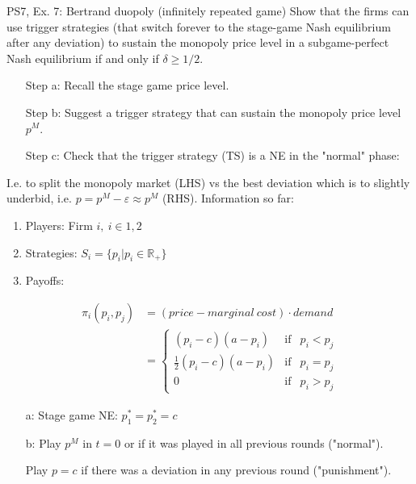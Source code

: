 \begin{frame}{PS7, Ex. 7: Bertrand duopoly (infinitely repeated game)}
    Show that the firms can use trigger strategies (that switch forever to the stage-game Nash equilibrium after any deviation) to sustain the monopoly price level in a subgame-perfect Nash equilibrium if and only if $\delta\geq1/2$.
    \vspace{-6pt}
    \begin{multicols}{2}
      \begin{itemize}
        \item[Step a:] Recall the stage game price level.
        \item[Step b:] Suggest a trigger strategy that can sustain the monopoly price level $p^M$.
        \item[Step c:] Check that the trigger strategy (TS) is a NE in the "normal" phase:
      \end{itemize}
      \vspace{-4pt}
      I.e. to split the monopoly market (LHS) vs the best deviation which is to slightly underbid, i.e. $p=p^M-\varepsilon\approx p^M$ (RHS).
      \vfill\null\columnbreak
      Information so far:
      \vspace{-4pt}
      \begin{enumerate}
        \item Players: Firm $i,\ i\in1,2$
        \item Strategies: $S_i=\{p_i|p_i\in\mathbb{R}_+\}$
        \item Payoffs:
      \end{enumerate}
      \vspace{-12pt}
      \begin{align*}
        \pi_i(p_i,p_j)&=(price-marginal\ cost)\cdot demand\\
                      &=\left\{\begin{array}{lcl}
          (p_i-c)(a-p_i)            & \text{if} & p_i<p_j\\
          \frac{1}{2}(p_i-c)(a-p_i) & \text{if} & p_i=p_j\\
          0                         & \text{if} & p_i>p_j
        \end{array}\right.
      \end{align*}
      \vspace{-16pt}
      \begin{itemize}
        \item[a:] Stage game NE: $p_1^*=p_2^*=c$
        \item[b:] Play $p^M$ in $t=0$ or if it was played in all previous rounds ("normal").
        \item[]   Play $p=c$ if there was a deviation in any previous round ("punishment").
      \end{itemize}
      \vfill\null
    \end{multicols}
\end{frame}
